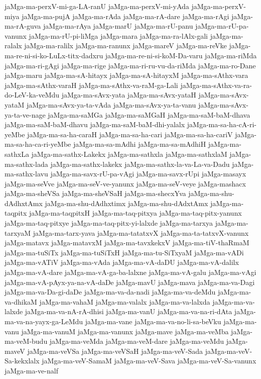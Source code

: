 {jaMga-ma-perxV-mi-ga-LA-ranU
jaMga-ma-perxV-mi-yAda
jaMga-ma-perxV-miya
jaMga-ma-pujA
jaMga-ma-rAda
jaMga-ma-rA-dare
jaMga-ma-rAgi
jaMga-ma-rA-guva
jaMga-ma-rAya
jaMga-marU
jaMga-ma-rU-panu
jaMga-ma-rU-pa-vanunx
jaMga-ma-rU-pi-liMga
jaMga-mara
jaMga-ma-ra-lAlx-gali
jaMga-ma-ralalx
jaMga-ma-ralilx
jaMga-ma-ranunx
jaMga-mareV
jaMga-ma-reVke
jaMga-ma-re-ni-si-ko-LuLx-titx-dadxru
jaMga-ma-re-ni-si-koM-Da-varu
jaMga-ma-riMda
jaMga-ma-ri-gAgi
jaMga-ma-rige
jaMga-ma-ri-ru-vu-da-riMda
jaMga-ma-ro-Dane
jaMga-maru
jaMga-ma-sA-hitayx
jaMga-ma-sA-hitayxM
jaMga-ma-sAthx-vara
jaMga-ma-sAthx-varaH
jaMga-ma-sAthx-va-raM-ga-Lali
jaMga-ma-sAthx-va-ra-do-LeV-ka-veMdu
jaMga-ma-sAvx-yata
jaMga-ma-sAvx-yataH
jaMga-ma-sAvx-yataM
jaMga-ma-sAvx-ya-ta-vAda
jaMga-ma-sAvx-ya-ta-vanu
jaMga-ma-sAvx-ya-ta-ve-nage
jaMga-ma-saMGa
jaMga-ma-saMGaH
jaMga-ma-saM-baM-dhava
jaMga-ma-saM-baM-dhavu
jaMga-ma-saM-baM-dhi-yalalx
jaMga-ma-sa-ha-cA-ri-yeMbe
jaMga-ma-sa-ha-caraH
jaMga-ma-sa-ha-cari
jaMga-ma-sa-ha-cariV
jaMga-ma-sa-ha-ca-ri-yeMbe
jaMga-ma-sa-mAdhi
jaMga-ma-sa-mAdhiH
jaMga-ma-sathxLa
jaMga-ma-sathx-Lakekx
jaMga-ma-sathxla
jaMga-ma-sathxlaM
jaMga-ma-sathx-lada
jaMga-ma-sathx-lakekx
jaMga-ma-sathx-la-va-La-va-Dadu
jaMga-ma-sathx-lavu
jaMga-ma-savx-rU-pa-vAgi
jaMga-ma-savx-rUpi
jaMga-masayx
jaMga-ma-seVve
jaMga-ma-seV-ve-yanunx
jaMga-ma-seV-veye
jaMga-mashacx
jaMga-ma-sheVSa
jaMga-ma-sheVSaH
jaMga-ma-shecxYva
jaMga-ma-shu-dAdhxtAmx
jaMga-ma-shu-dAdhxtimx
jaMga-ma-shu-dAdxtAmx
jaMga-ma-taqpitx
jaMga-ma-taqpitxH
jaMga-ma-taq-pitxya
jaMga-ma-taq-pitx-yanunx
jaMga-ma-taq-pitxye
jaMga-ma-taq-pitx-yi-lalxde
jaMga-ma-tarxya
jaMga-ma-tarxyaM
jaMga-ma-tarx-yava
jaMga-ma-tatatxvX
jaMga-ma-ta-tatxvX-vanunx
jaMga-matavx
jaMga-matavxM
jaMga-ma-tavxkekxV
jaMga-ma-tiV-thaRmaM
jaMga-ma-tuSiTx
jaMga-ma-tuSiTxH
jaMga-ma-tu-SiTxyaM
jaMga-ma-vADi
jaMga-ma-vATiV
jaMga-ma-vAda
jaMga-ma-vA-daDU
jaMga-ma-vA-dalilx
jaMga-ma-vA-dare
jaMga-ma-vA-ga-ba-lalxne
jaMga-ma-vA-galu
jaMga-ma-vAgi
jaMga-ma-vA-pAyx-ya-na-vA-daDe
jaMga-mavU
jaMga-mava
jaMga-ma-va-Dagi
jaMga-ma-va-Da-gi-daDe
jaMga-ma-va-da-nadi
jaMga-ma-va-deMdu
jaMga-ma-va-dhikaM
jaMga-ma-vahaM
jaMga-ma-valalx
jaMga-ma-va-lalxda
jaMga-ma-va-lalxde
jaMga-ma-va-nA-rA-dhisi
jaMga-ma-vanU
jaMga-ma-va-na-ri-dAta
jaMga-ma-va-na-yayx-ga-LeMdu
jaMga-ma-vane
jaMga-ma-va-no-li-sa-beVku
jaMga-ma-vanu
jaMga-ma-vanuM
jaMga-ma-vanunx
jaMga-mave
jaMga-ma-veMba
jaMga-ma-veM-budu
jaMga-ma-veMda
jaMga-ma-veM-dare
jaMga-ma-veMdu
jaMga-maveV
jaMga-ma-veVSa
jaMga-ma-veVSaH
jaMga-ma-veV-Sada
jaMga-ma-veV-Sa-kekxlalx
jaMga-ma-veV-SamaM
jaMga-ma-veV-Sava
jaMga-ma-veV-Sa-vanunx
jaMga-ma-ve-nalf
}
